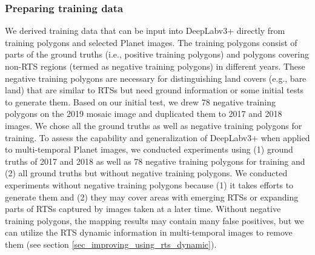 \documentclass[authoryear,preprint,review,12pt]{elsarticle}
\begin{document}

\subsubsection{Preparing training data}
\label{sec_prepare_training}



We derived training data that can be input into DeepLabv3+ directly from training polygons and selected Planet images.
The training polygons consist of parts of the ground truths (i.e., positive training polygons) and polygons covering non-RTS regions (termed as negative training polygons) in different years.
These negative training polygons are necessary for distinguishing land covers (e.g., bare land) that are similar to RTSs but need ground information or some initial tests to generate them. 
Based on our initial test, we drew 78 negative training polygons on the 2019 mosaic image and duplicated them to 2017 and 2018 images. 
We chose all the ground truths as well as negative training polygons for training. 
To assess the capability and generalization of DeepLabv3+ when applied to multi-temporal Planet images, we conducted experiments using (1) ground truths of 2017 and 2018 as well as 78 negative training polygons for training and (2) all ground truths but without negative training polygons.
We conducted experiments without negative training polygons because (1) it takes efforts to generate them and (2) they may cover areas with emerging RTSs or expanding parts of RTSs captured by images taken at a later time. 
Without negative training polygons, the mapping results may contain many false positives, but we can utilize the RTS dynamic information in multi-temporal images to remove them (see section \ref{sec_improving_using_rts_dynamic}).
\end{document}

